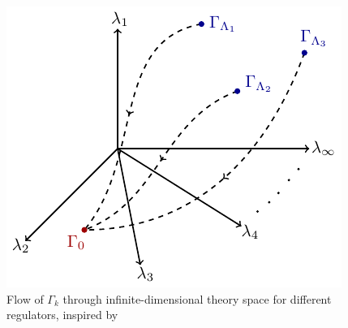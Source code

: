 \begin{figure}[H]
\centering
\includegraphics{figs/TikZ/regulator_dependence}
\caption[Flow of $\Gamma_k$ through infinite-dimensional theory space for different regulators]{Flow of $\Gamma_k$ through infinite-dimensional theory space for different regulators, inspired by \cite{Riebesell2017}}	
\end{figure}